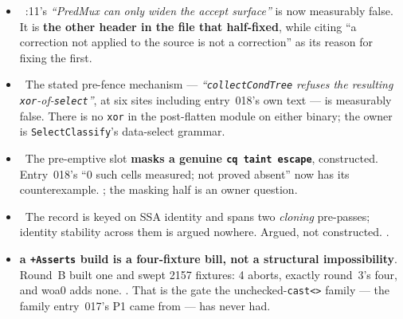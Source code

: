 \begin{itemize}
  \item \fdoc\ :11's \emph{``PredMux can only widen the
        accept surface''} is now measurably false. It is \textbf{the other header in the file
        that  half-fixed}, while citing ``a correction not applied to the
        source is not a correction'' as its reason for fixing the first.
  \item \fdoc\ The stated pre-fence mechanism --- \emph{``\texttt{collectCondTree} refuses the
        resulting \texttt{xor}-of-\texttt{select}''}, at six sites including entry~018's own
        text --- is measurably false. There is no \texttt{xor} in the post-flatten module on
        either binary; the owner is \texttt{SelectClassify}'s data-select grammar.
  \item \fpreexisting\ The pre-emptive slot \textbf{masks a genuine \texttt{cq taint escape}},
        constructed. Entry~018's ``0 such cells measured; not proved absent'' now has its
        counterexample. ; the masking half is an owner question.
  \item \fpreexisting\ The record is keyed on SSA identity and spans two \emph{cloning}
        pre-passes; identity stability across them is argued nowhere. Argued, not constructed.
        .
  \item {} \textbf{a \texttt{+Asserts} build is a four-fixture bill, not a
        structural impossibility}. Round~B built one and swept 2157 fixtures: 4 aborts, exactly
        round~3's four, and woa0 adds none. . That is the gate the
        unchecked-\texttt{cast<>} family --- the family entry~017's P1 came from --- has never
        had.
\end{itemize}

